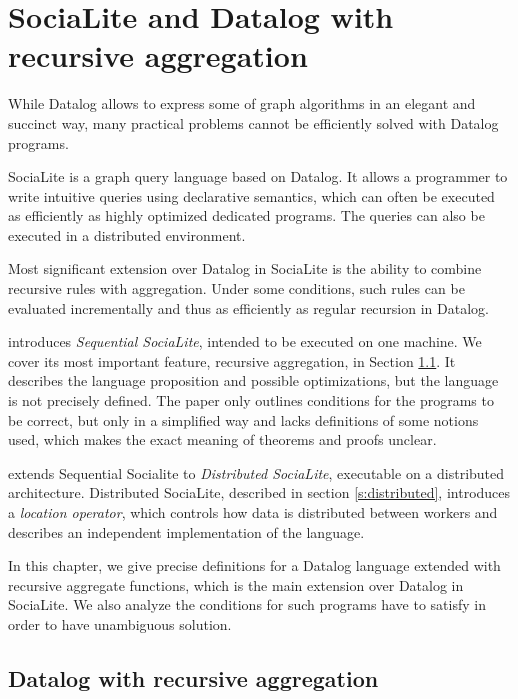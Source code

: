 
\chapter{SociaLite and Datalog with recursive aggregation}\label{r:socialite}

While Datalog allows to express some of graph algorithms
in an elegant and succinct way, many practical problems cannot be efficiently solved with Datalog programs.

SociaLite \cite{socialite, distsoc} is a graph query language based on Datalog.  It allows a programmer to write intuitive queries using declarative semantics, which can often be executed as efficiently as highly optimized dedicated programs. The queries can also be executed in a distributed environment.

Most significant extension over Datalog in SociaLite is the ability to combine recursive rules with aggregation. Under some conditions, such rules can be evaluated incrementally and thus as efficiently as regular recursion in Datalog.

\cite{socialite} introduces \emph{Sequential SociaLite}, intended to be executed on one machine. We cover its most important feature, recursive aggregation, in Section \ref{s:recaggr}. It describes the language proposition and possible optimizations, but the language is not precisely defined. The paper only outlines conditions for the programs to be correct, but only in a simplified way and lacks definitions of some notions used, which makes the exact meaning of theorems and proofs unclear.

\cite{distsoc} extends Sequential Socialite to \emph{Distributed SociaLite}, executable on a distributed architecture. Distributed SociaLite, described in section \ref{s:distributed}, introduces a \emph{location operator}, which controls how data is distributed between workers and describes an independent implementation of the language. 

In this chapter, we give precise definitions for a Datalog language extended with recursive aggregate functions, which is the main extension over Datalog in SociaLite. We also analyze the conditions for such programs have to satisfy in order to have unambiguous solution.

\section{Datalog with recursive aggregation}\label{s:recaggr}

